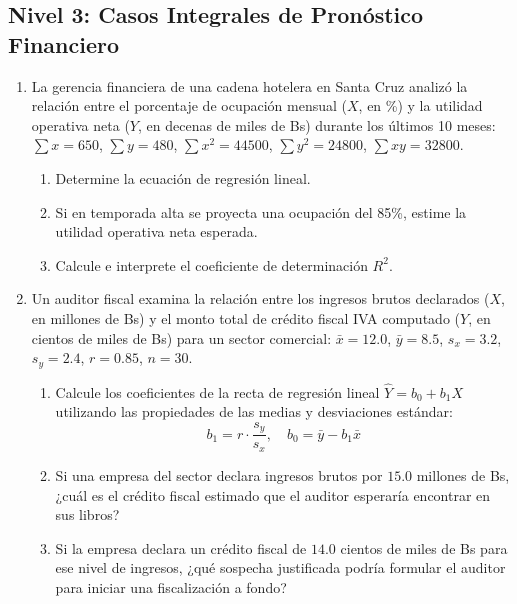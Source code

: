 \subsection*{Nivel 3: Casos Integrales de Pronóstico Financiero}
\begin{enumerate}[resume]
    \item La gerencia financiera de una cadena hotelera en Santa Cruz analizó la relación entre el porcentaje de ocupación mensual ($X$, en \%) y la utilidad operativa neta ($Y$, en decenas de miles de Bs) durante los últimos 10 meses:
    $\sum x = 650$, $\sum y = 480$, $\sum x^2 = 44500$, $\sum y^2 = 24800$, $\sum xy = 32800$.
    \begin{enumerate}
        \item Determine la ecuación de regresión lineal.
        \item Si en temporada alta se proyecta una ocupación del 85\%, estime la utilidad operativa neta esperada.
        \item Calcule e interprete el coeficiente de determinación $R^2$.
    \end{enumerate}

    \item Un auditor fiscal examina la relación entre los ingresos brutos declarados ($X$, en millones de Bs) y el monto total de crédito fiscal IVA computado ($Y$, en cientos de miles de Bs) para un sector comercial:
    $\bar{x} = 12.0$, $\bar{y} = 8.5$, $s_x = 3.2$, $s_y = 2.4$, $r = 0.85$, $n = 30$.
    \begin{enumerate}
        \item Calcule los coeficientes de la recta de regresión lineal $\hat{Y} = b_0 + b_1 X$ utilizando las propiedades de las medias y desviaciones estándar:
        \[
        b_1 = r \cdot \frac{s_y}{s_x}, \quad b_0 = \bar{y} - b_1 \bar{x}
        \]
        \item Si una empresa del sector declara ingresos brutos por $15.0$ millones de Bs, ¿cuál es el crédito fiscal estimado que el auditor esperaría encontrar en sus libros?
        \item Si la empresa declara un crédito fiscal de $14.0$ cientos de miles de Bs para ese nivel de ingresos, ¿qué sospecha justificada podría formular el auditor para iniciar una fiscalización a fondo?
    \end{enumerate}
\end{enumerate}
